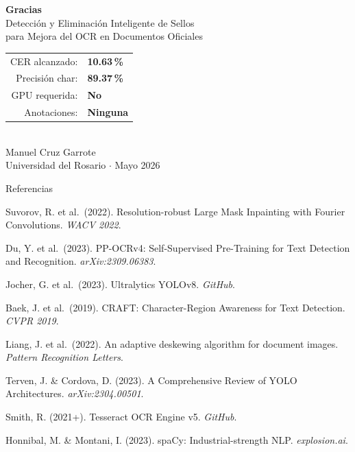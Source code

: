 \documentclass[aspectratio=169, 11pt]{beamer}
\begin{document}
\begin{frame}[standout]
  \centering
  {\Large\bfseries Gracias}\\[16pt]
  {\normalsize Detección y Eliminación Inteligente de Sellos\\
   para Mejora del OCR en Documentos Oficiales}\\[20pt]
  \begin{tabular}{rl}
    CER alcanzado: & \textbf{10.63\,\%} \\
    Precisión char: & \textbf{89.37\,\%} \\
    GPU requerida: & \textbf{No} \\
    Anotaciones: & \textbf{Ninguna} \\
  \end{tabular}\\[20pt]
  {\small Manuel Cruz Garrote}\\
  {\small Universidad del Rosario $\cdot$ Mayo 2026}
\end{frame}

\begin{frame}[allowframebreaks]{Referencias}
  \scriptsize
  \begin{enumerate}[label={[\arabic*]}, leftmargin=1.8em, itemsep=4pt]
    \item Suvorov, R. et al.\ (2022). Resolution-robust Large Mask Inpainting
          with Fourier Convolutions. \textit{WACV 2022}.
    \item Du, Y. et al.\ (2023). PP-OCRv4: Self-Supervised Pre-Training for
          Text Detection and Recognition. \textit{arXiv:2309.06383}.
    \item Jocher, G. et al.\ (2023). Ultralytics YOLOv8. \textit{GitHub}.
    \item Baek, J. et al.\ (2019). CRAFT: Character-Region Awareness for
          Text Detection. \textit{CVPR 2019}.
    \item Liang, J. et al.\ (2022). An adaptive deskewing algorithm for
          document images. \textit{Pattern Recognition Letters}.
    \item Terven, J. \& Cordova, D. (2023). A Comprehensive Review of YOLO
          Architectures. \textit{arXiv:2304.00501}.
    \item Smith, R. (2021+). Tesseract OCR Engine v5. \textit{GitHub}.
    \item Honnibal, M. \& Montani, I. (2023). spaCy: Industrial-strength NLP.
          \textit{explosion.ai}.
  \end{enumerate}
\end{frame}
\end{document}
